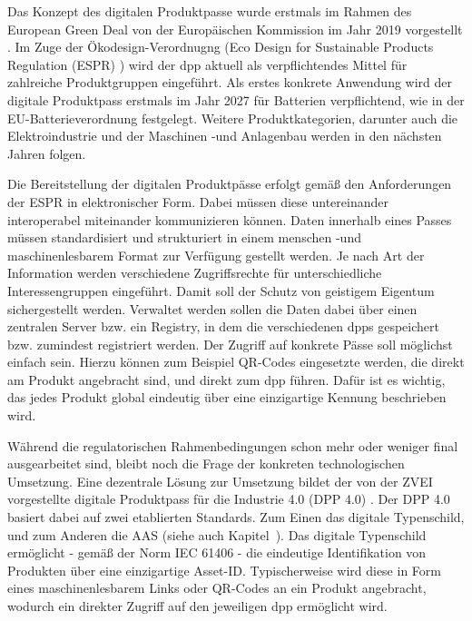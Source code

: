 Das Konzept des digitalen Produktpasse wurde erstmals im Rahmen des European Green Deal von der Europäischen Kommission im Jahr 2019 vorgestellt \cite{GreenDeal}.
Im Zuge der Ökodesign-Verordnugng (Eco Design for Sustainable Products Regulation (ESPR) ) \cite{ESPR} wird der \acs{dpp} aktuell als verpflichtendes Mittel für zahlreiche Produktgruppen eingeführt.
Als erstes konkrete Anwendung wird der digitale Produktpass erstmals im Jahr 2027 für Batterien verpflichtend, wie in der EU-Batterieverordnung festgelegt.
Weitere Produktkategorien, darunter auch die Elektroindustrie und der Maschinen -und Anlagenbau werden in den nächsten Jahren folgen.

Die Bereitstellung der digitalen Produktpässe erfolgt gemäß den Anforderungen der ESPR in elektronischer Form. Dabei müssen diese untereinander interoperabel miteinander kommunizieren können.
Daten innerhalb eines Passes müssen standardisiert und strukturiert in einem menschen -und maschinenlesbarem Format zur Verfügung gestellt werden.
Je nach Art der Information werden verschiedene Zugriffsrechte für unterschiedliche Interessengruppen eingeführt. Damit soll der Schutz von geistigem Eigentum sichergestellt werden.
Verwaltet werden sollen die Daten dabei über einen zentralen Server bzw. ein Registry, in dem die verschiedenen \acsp{dpp} gespeichert bzw. zumindest registriert werden.
Der Zugriff auf konkrete Pässe soll möglichst einfach sein. Hierzu können zum Beispiel QR-Codes eingesetzte werden, die direkt am Produkt angebracht sind, und direkt zum \acs{dpp} führen.
Dafür ist es wichtig, das jedes Produkt global eindeutig über eine einzigartige Kennung beschrieben wird.
\cite{CIRPASS}

Während die regulatorischen Rahmenbedingungen schon mehr oder weniger final ausgearbeitet sind, bleibt noch die Frage der konkreten technologischen Umsetzung.
Eine dezentrale Lösung zur Umsetzung bildet der von der ZVEI vorgestellte digitale Produktpass für die Industrie 4.0 (DPP 4.0) \cite{DPP40}.
Der DPP 4.0 basiert dabei auf zwei etablierten Standards. Zum Einen das digitale Typenschild, und zum Anderen die AAS (siehe auch Kapitel~).
Das digitale Typenschild ermöglicht - gemäß der Norm IEC 61406 \cite{TypenschildIEC61406-1} - die eindeutige Identifikation von Produkten über eine einzigartige Asset-ID.
Typischerweise wird diese in Form eines maschinenlesbarem Links oder QR-Codes an ein Produkt angebracht, wodurch ein direkter Zugriff auf den jeweiligen \acs{dpp} ermöglicht wird.

